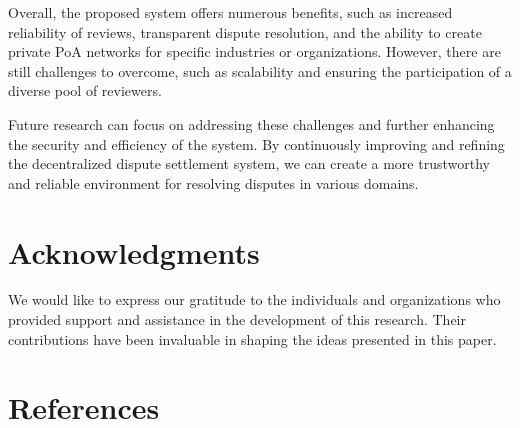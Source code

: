 \documentclass{article}
\begin{document}
Overall, the proposed system offers numerous benefits, such as increased reliability of reviews, transparent dispute resolution, and the ability to create private PoA networks for specific industries or organizations. However, there are still challenges to overcome, such as scalability and ensuring the participation of a diverse pool of reviewers.

Future research can focus on addressing these challenges and further enhancing the security and efficiency of the system. By continuously improving and refining the decentralized dispute settlement system, we can create a more trustworthy and reliable environment for resolving disputes in various domains.

\section*{Acknowledgments}
We would like to express our gratitude to the individuals and organizations who provided support and assistance in the development of this research. Their contributions have been invaluable in shaping the ideas presented in this paper.

\section*{References}
\end{document}
